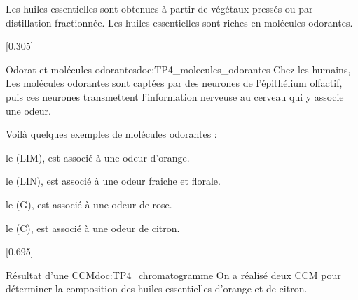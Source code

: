 


\newpage

\begin{contexte}
  Les huiles essentielles sont obtenues à partir de végétaux pressés ou par distillation fractionnée.
  Les huiles essentielles sont riches en molécules odorantes.
  
\end{contexte}


[0.305]{
  \begin{doc}{Odorat et molécules odorantes}{doc:TP4_molecules_odorantes}
    Chez les humains, Les molécules odorantes sont captées par des neurones de l’épithélium olfactif,
    puis ces neurones transmettent l'information nerveuse au cerveau qui y associe une odeur.
  
    Voilà quelques exemples de molécules odorantes :
    \begin{listePoints}
      \item le  (LIM), est associé à une odeur d'orange.
      \item le  (LIN), est associé à une odeur fraiche et florale.
      \item le  (G), est associé à une odeur de rose.
      \item le  (C), est associé à une odeur de citron.
    \end{listePoints}
  \end{doc}
}[0.695]



\begin{doc}{Résultat d'une CCM}{doc:TP4_chromatogramme}
  On a réalisé deux CCM pour déterminer la composition des huiles essentielles d'orange et de citron.
  \begin{multicols}{2}
    \centering
    
  \end{multicols}
  
\end{doc}

